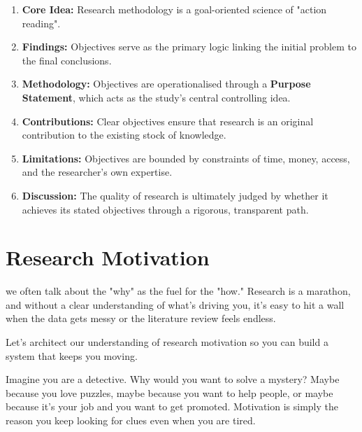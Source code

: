 \documentclass{report}
\begin{document}
\begin{paper}
    \begin{enumerate}
        \item \textbf{Core Idea:} Research methodology is a goal-oriented science of "action reading".
        \item \textbf{Findings:} Objectives serve as the primary logic linking the initial problem to the final conclusions.
        \item \textbf{Methodology:} Objectives are operationalised through a \textbf{Purpose Statement}, which acts as the study's central controlling idea.
        \item \textbf{Contributions:} Clear objectives ensure that research is an original contribution to the existing stock of knowledge.
        \item \textbf{Limitations:} Objectives are bounded by constraints of time, money, access, and the researcher's own expertise.
        \item \textbf{Discussion:} The quality of research is ultimately judged by whether it achieves its stated objectives through a rigorous, transparent path.
    \end{enumerate}
\end{paper}


\section{Research Motivation}

we often talk about the "why" as the fuel for the "how." Research is a marathon, and without a clear understanding of what's driving you, it's easy to hit a wall when the data gets messy or the literature review feels endless.

Let's architect our understanding of research motivation so you can build a system that keeps you moving.

\begin{layerELI5}
    Imagine you are a detective. Why would you want to solve a mystery? Maybe because you love puzzles, maybe because you want to help people, or maybe because it's your job and you want to get promoted. Motivation is simply the reason you keep looking for clues even when you are tired.
\end{layerELI5}
\end{document}
